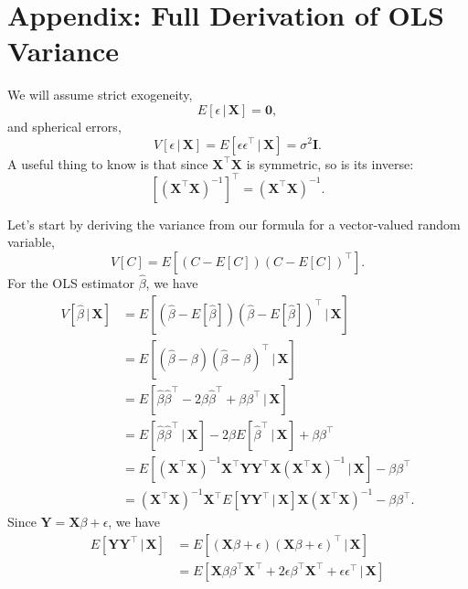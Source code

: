 \documentclass[12pt,oneside,openany]{book}
\begin{document}
\section{Appendix: Full Derivation of OLS
Variance}\label{appendix-full-derivation-of-ols-variance}

We will assume strict exogeneity, \[
E [\epsilon \,|\, \mathbf{X}] = \mathbf{0},
\] and spherical errors, \[
V [\epsilon \,|\, \mathbf{X}] = E [\epsilon \epsilon^\top \,|\, \mathbf{X}] = \sigma^2 \mathbf{I}.
\] A useful thing to know is that since \(\mathbf{X}^\top \mathbf{X}\)
is symmetric, so is its inverse: \[
[(\mathbf{X}^\top \mathbf{X})^{-1}]^\top = (\mathbf{X}^\top \mathbf{X})^{-1}.
\]

Let's start by deriving the variance from our formula for a
vector-valued random variable, \[
V[C] = E \left[ (C - E[C]) (C - E[C])^\top \right].
\] For the OLS estimator \(\hat{\beta}\), we have \[
\begin{aligned}
  V[\hat{\beta} \,|\, \mathbf{X}]
  &= E \left[ \left(\hat{\beta} - E[\hat{\beta}]\right) \left(\hat{\beta} - E[\hat{\beta}]\right)^\top \,|\, \mathbf{X} \right] \\
  &= E \left[ \left(\hat{\beta} - \beta\right) \left(\hat{\beta} - \beta\right)^\top \,|\, \mathbf{X} \right] \\
  &= E \left[ \hat{\beta} \hat{\beta}^\top - 2 \beta \hat{\beta}^\top + \beta \beta^\top \,|\, \mathbf{X} \right] \\
  &= E \left[ \hat{\beta} \hat{\beta}^\top \,|\, \mathbf{X} \right] - 2 \beta E \left[ \hat{\beta}^\top \,|\, \mathbf{X} \right] + \beta \beta^\top \\
  &= E \left[ (\mathbf{X}^\top \mathbf{X})^{-1} \mathbf{X}^\top \mathbf{Y} \mathbf{Y}^\top \mathbf{X} (\mathbf{X}^\top \mathbf{X})^{-1} \,|\, \mathbf{X} \right] - \beta \beta^\top \\
  &= (\mathbf{X}^\top \mathbf{X})^{-1} \mathbf{X}^\top E \left[ \mathbf{Y} \mathbf{Y}^\top \,|\, \mathbf{X} \right] \mathbf{X} (\mathbf{X}^\top \mathbf{X})^{-1} - \beta \beta^\top.
\end{aligned}
\] Since \(\mathbf{Y} = \mathbf{X} \beta + \epsilon\), we have \[
\begin{aligned}
  E \left[ \mathbf{Y} \mathbf{Y}^\top \,|\, \mathbf{X} \right]
  &= E \left[ (\mathbf{X} \beta + \epsilon) (\mathbf{X} \beta + \epsilon)^\top \,|\, \mathbf{X} \right] \\
  &= E \left[ \mathbf{X} \beta \beta^\top \mathbf{X}^\top + 2 \epsilon \beta^\top \mathbf{X}^\top + \epsilon \epsilon^\top \,|\, \mathbf{X} \right] \\

\end{aligned}\]
\end{document}
